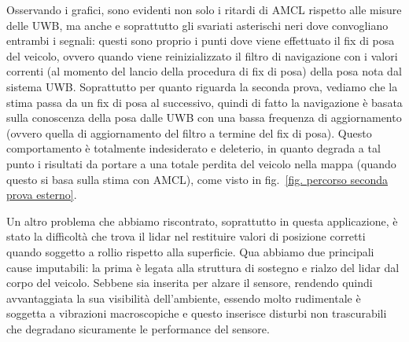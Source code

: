 Osservando i grafici, sono evidenti non solo i ritardi di AMCL rispetto alle misure delle UWB, ma anche e soprattutto gli svariati asterischi neri dove convogliano entrambi i segnali: questi sono proprio i punti dove viene effettuato il fix di posa del veicolo, ovvero quando viene reinizializzato il filtro di navigazione con i valori correnti (al momento del lancio della procedura di fix di posa) della posa nota dal sistema UWB. 
Soprattutto per quanto riguarda la seconda prova, vediamo che la stima passa da un fix di posa al successivo, quindi di fatto la navigazione è basata sulla conoscenza della posa dalle UWB con una bassa frequenza di aggiornamento (ovvero quella di aggiornamento del filtro a termine del fix di posa). Questo comportamento è totalmente indesiderato e deleterio, in quanto degrada a tal punto i risultati da portare a una totale perdita del veicolo nella mappa (quando questo si basa sulla stima con AMCL), come visto in fig.~\ref{fig. percorso seconda prova esterno}.

\vspace{0.5cm}
Un altro problema che abbiamo riscontrato, soprattutto in questa applicazione, è stato la difficoltà che trova il lidar nel restituire valori di posizione corretti quando soggetto a rollio rispetto alla superficie. Qua abbiamo due principali cause imputabili: la prima è legata alla struttura di sostegno e rialzo del lidar dal corpo del veicolo. 
Sebbene sia inserita per alzare il sensore, rendendo quindi avvantaggiata la sua visibilità dell'ambiente, essendo molto rudimentale è soggetta a vibrazioni macroscopiche e questo inserisce disturbi non trascurabili che degradano sicuramente le performance del sensore. 

